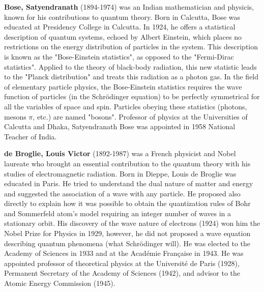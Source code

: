 \textbf{Bose, Satyendranath} (1894-1974) was an Indian mathematician and physicis, known for his contributions to quantum theory. Born in Calcutta, Bose was educated at Presidency College in Calcutta. In 1924, he offers a statistical description of quantum systems, echoed by Albert Einstein, which places no restrictions on the energy distribution of particles in the system. This description is known as the "Bose-Einstein statistics", as opposed to the "Fermi-Dirac statistics". Applied to the theory of black-body radiation, this new statistic leads to the "Planck distribution" and treats this radiation as a photon gas. In the field of elementary particle physics, the Bose-Einstein statistics requires the wave function of particles (in the Schrödinger equation) to be perfectly symmetrical for all the variables of space and spin. Particles obeying these statistics (photons, mesons $\pi$, etc.) are named "bosons". Professor of physics at the Universities of Calcutta and Dhaka, Satyendranath Bose was appointed in 1958 National Teacher of India.

\textbf{de Broglie, Louis Victor} (1892-1987) was a  French physicist and Nobel laureate who brought an essential contribution to the quantum theory with his studies of electromagnetic radiation. Born in Dieppe, Louis de Broglie was educated in Paris. He tried to understand the dual nature of matter and energy and suggested the association of a wave with any particle. He proposed also directly to explain how it was possible to obtain the quantization rules of Bohr and Sommerfeld atom's model requiring an integer number of waves in a stationary orbit. His discovery of the wave nature of electrons (1924) won him the Nobel Prize for Physics in 1929, however, he did not proposed a wave equation describing quantum phenomena (what Schrödinger will). He was elected to the Academy of Sciences in 1933 and at the Académie Française in 1943. He was appointed professor of theoretical physics at the Université de Paris (1928), Permanent Secretary of the Academy of Sciences (1942), and advisor to the Atomic Energy Commission (1945).

